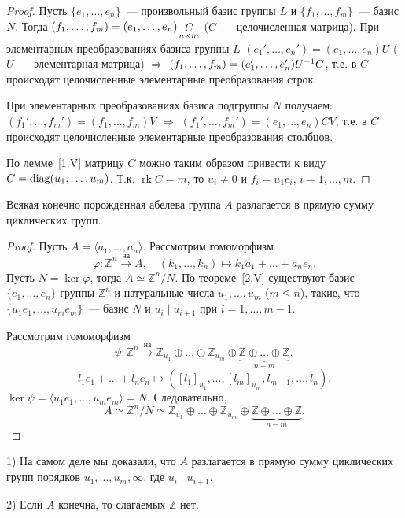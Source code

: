 \documentclass[a4paper]{article}
\renewcommand{\rk}{\mathop{\mathrm{rk}}\nolimits}
\renewcommand{\diag}{\mathop{\mathrm{diag}}\nolimits}
\newcommand*{\p}[1]{#1\nobreak\discretionary{}{\hbox{$\mathsurround=0pt #1$}}{}}
\begin{document}
\begin{proof}
Пусть $\{e_1,\ldots,e_n\}$~--- произвольный базис группы $L$ и
$\{f_1,\ldots,f_m\}$~--- базис $N$. Тогда
$(f_1,\ldots,f_m)\p=(e_1,\ldots,e_n)\mathop{C}\limits_{n\times m}$
($C$~--- целочисленная матрица). При элементарных преобразованиях
базиса группы $L$ $(e_1',\ldots,e_n')=(e_1,\ldots,e_n)U$ ($U$~---
элементарная матрица) $\Rightarrow$
$(f_1,\ldots,f_m)\p=(e_1',\ldots,e_n')U^{-1}C$, т.е. в $C$
происходят целочисленные элементарные преобразования строк.

При элементарных преобразованиях базиса подгруппы $N$ получаем:
$(f_1',\ldots,f_m')=(f_1,\ldots,f_m)V$ $\Rightarrow$
$(f_1',\ldots,f_m')=(e_1,\ldots,e_n)CV$, т.е. в $C$ происходят
целочисленные элементарные преобразования столбцов.

По лемме~\ref{1.V} матрицу $C$ можно таким образом привести к виду
$C\p=\diag(u_1,\ldots,u_m)$. Т.к. $\rk C=m$, то $u_i\neq 0$ и
$f_i=u_1e_i$, $i=1,\ldots,m$.
\end{proof}

\begin{theorem}
Всякая конечно порожденная абелева группа $A$ разлагается в прямую
сумму циклических групп.
\end{theorem}

\begin{proof}
Пусть $A=\langle a_1,\ldots,a_n\rangle$. Рассмотрим гомоморфизм
$$\varphi\colon \mathbb{Z}^n\stackrel{\text{на}}{\to}A,\quad
(k_1,\ldots,k_n)\mapsto k_1a_1+\ldots+a_ne_n.$$ Пусть $N=\ker
\varphi$, тогда $A\simeq \mathbb{Z}^n/N$. По теореме~\ref{2.V}
существуют базис $\{e_1,\ldots,e_n\}$ группы $\mathbb{Z}^n$ и
натуральные числа $u_1,\ldots,u_m$ ($m\leqslant n$), такие, что
$\{u_1e_1,\ldots,u_me_m\}$~--- базис $N$ и $u_i\mid u_{i+1}$ при
$i=1,\ldots,m-1$.

Рассмотрим гомоморфизм
$$\psi\colon\mathbb{Z}^n\stackrel{\text{на}}{\to}\mathbb{Z}_{u_1}
\oplus\ldots\oplus\mathbb{Z}_{u_m}\oplus\underbrace{\mathbb{Z}
\oplus\ldots\oplus\mathbb{Z}}_{n-m},$$ $$l_1e_1+\ldots+l_ne_n\mapsto
([l_1]_{u_1},\ldots,[l_m]_{u_m},l_{m+1},\ldots,l_n).$$
$\ker\psi=\langle u_1e_1,\ldots,u_me_m\rangle=N$. Следовательно,
$$A\simeq\mathbb{Z}^n/N\simeq\mathbb{Z}_{u_1}
\oplus\ldots\oplus\mathbb{Z}_{u_m}\oplus\underbrace{\mathbb{Z}
\oplus\ldots\oplus\mathbb{Z}}_{n-m}.$$
\end{proof}

\begin{note}
1) На самом деле мы доказали, что $A$ разлагается в прямую сумму
циклических групп порядков $u_1,\ldots,u_m,\infty$, где $u_i\mid
u_{i+1}$.

2) Если $A$ конечна, то слагаемых $\mathbb{Z}$ нет.
\end{note}
\end{document}
